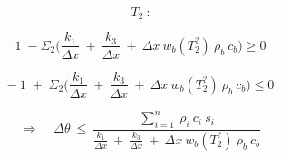 \begin{adjustwidth}{0cm}{0cm}
	\begin{multicols}{3} %
		
		
		\hspace{-3cm}
		\begin{minipage}{\columnwidth}	
			\vspace{1cm}
			$$T_2 \: \mbox{:}$$ 
		\end{minipage}
		
		\columnbreak %
		
		
		\hspace{-5.5cm}
		\begin{minipage}{\columnwidth}	
			$$
			1 \;-\Sigma_2 \Big(\frac{k_{1}}{\Delta x}  \:+\: \frac{k_{3}}{\Delta x} \:+\:  \Delta x \: w_b (T_2^?) \: \rho _b \: c_b \Big) \geq 0
			$$
			
			\vspace{-1cm}
			
			$$
			- \: 1 \;+\; \Sigma_2 \Big(\frac{k_{1}}{\Delta x}  \:+\: \frac{k_{3}}{\Delta x} \:+\:  \Delta x \: w_b (T_2^?) \: \rho _b \: c_b \Big) \leq 0
			$$
			
			
		\end{minipage}
		
		\columnbreak
		
		\hspace{-1.5cm}
		\begin{minipage}{1.3\columnwidth}
			\vspace{0.7cm}
			$$
			\Rightarrow \;\;\;\; \Delta \theta \:\leq\: \frac{\sum_{i=1}^n \: \rho_i \: c_i \: s_i}{\frac{k_{1}}{\Delta x}  \:+\: \frac{k_{3}}{\Delta x} \:+\:  \Delta x \: w_b (T_2^?) \: \rho _b \: c_b }
			$$
		\end{minipage}
		
	\end{multicols}
\end{adjustwidth}

